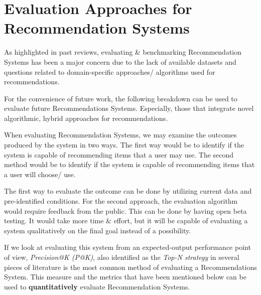 \documentclass[manuscript,screen,review]{acmart}
\begin{document}

\section{Evaluation Approaches for Recommendation Systems}

As highlighted in past reviews, evaluating \& benchmarking Recommendation Systems has been a major concern due to the lack of available datasets and questions related to domain-specific approaches/ algorithms used for recommendations.

For the convenience of future work, the following breakdown can be used to evaluate future Recommendations Systems. Especially, those that integrate novel algorithmic, hybrid approaches for recommendations.

\bigbreak
When evaluating Recommendation Systems, we may examine the outcomes produced by the system in two ways.
The first way would be to identify if the system is capable of recommending items that a user may use. The second method would be to identify if the system is capable of recommending items that a user will choose/ use.

The first way to evaluate the outcome can be done by utilizing current data and pre-identified conditions. For the second approach, the evaluation algorithm would require feedback from the public. This can be done by having open beta testing. It would take more time \& effort, but it will be capable of evaluating a system qualitatively on the final goal instead of a possibility.

If we look at evaluating this system from an expected-output performance point of view, \textit{Precision@K (P@K)}, also identified as the \textit{Top-N strategy} in several pieces of literature is the most common method of evaluating a Recommendations System.
This measure and the metrics that have been mentioned below can be used to \textbf{quantitatively} evaluate Recommendation Systems.
\end{document}
